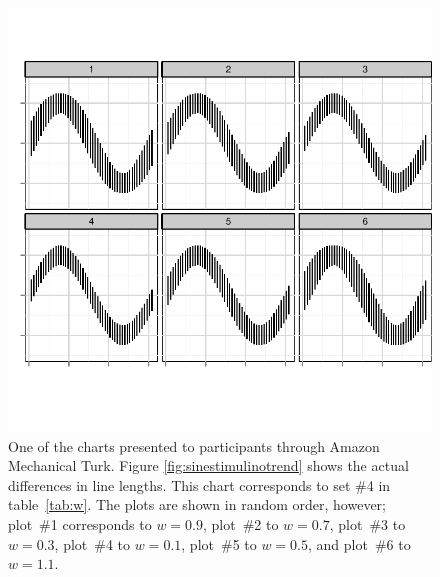 \documentclass[11pt]{isuthesis}\usepackage[]{graphicx}\usepackage[]{color}
\begin{document}
\begin{figure}
\centering
\includegraphics[width=6in]{fig-stimulicorrectionsize1}
\caption{One of the charts presented to participants through Amazon Mechanical Turk. Figure \ref{fig:sinestimulinotrend} shows the actual differences in line lengths. This chart corresponds to set \#4 in table~\ref{tab:w}. The plots are shown in random order, however; plot~\#1 corresponds to $w=0.9$, plot~\#2 to $w=0.7$, plot~\#3 to $w=0.3$, plot~\#4 to $w=0.1$, plot~\#5 to $w=0.5$, and plot~\#6 to $w=1.1$.}\label{fig:sinestimuli}
\end{figure}
\end{document}
